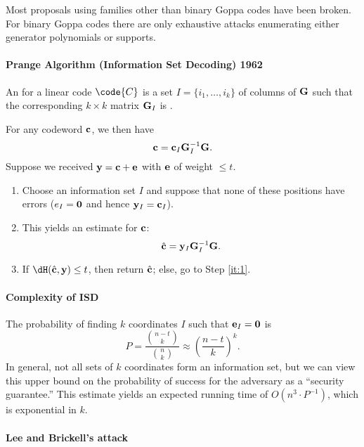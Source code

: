 \documentclass[a4paper, 11pt, openany]{book}
\begin{document}
 Most proposals using families other than binary Goppa codes have been broken. For binary Goppa codes there are only exhaustive attacks enumerating either generator polynomials or supports.




\paragraph{Prange Algorithm (Information Set Decoding) 1962}

An  for a linear code $\code{C}$ is a set $I =\{ i_1, \dots, i_k \}$ of columns of ${\bf G}$ such that the corresponding $k \times k$ matrix ${\bf G}_I$ is .

For any codeword ${\bf c}$, we then have
\[
    {\bf c} = {\bf c}_I {\bf G}_I^{-1} {\bf G}.
\]
Suppose we received ${\bf y} = {\bf c} + {\bf e}$ with ${\bf e}$ of weight $\le t$.
\begin{enumerate}
	\item \label{it:1} Choose an information set $I$ and suppose that none of these positions have errors ($e_I = {\bf 0}$ and hence ${\bf y}_I = {\bf c}_I$).

	\item This yields an estimate for ${\bf c}$:
	\[
		\hat{\bf c} = {\bf y}_I {\bf G}_I^{-1} {\bf G}.
	\]

	\item If $\dH(\hat{\bf c}, {\bf y}) \le t$, then return $\hat{\bf c}$; 	else, go to Step \ref{it:1}.
\end{enumerate}


\paragraph{Complexity of ISD}
The probability of finding $k$ coordinates $I$ such that ${\bf e}_I = {\bf 0}$ is
\[
	P = \frac{ \binom{n-t}{k} }{ \binom{n}{k} } \approx \left( \frac{n - t}{k} \right)^k.
\]
In general, not all sets of $k$ coordinates form an information set, but we can view this upper bound on the probability of success for the adversary as a ``security guarantee.'' This estimate yields an expected running time of $O(n^3 \cdot P^{-1})$, which is exponential in $k$.


\paragraph{Lee and Brickell's attack}
\end{document}
